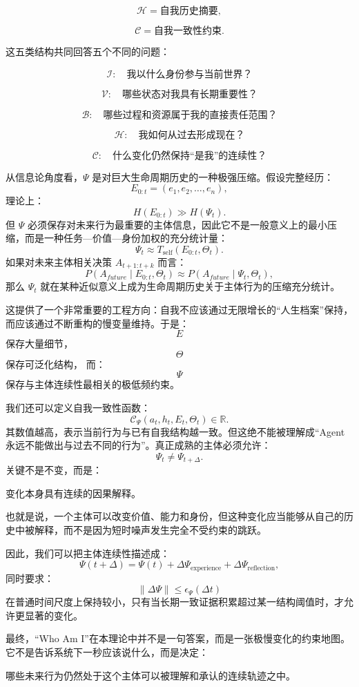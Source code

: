 \[
\mathcal H
=
\text{自我历史摘要},
\]

\[
\mathcal C
=
\text{自我一致性约束}.
\]

这五类结构共同回答五个不同的问题：

\[
\mathcal I:
\quad
\text{我以什么身份参与当前世界？}
\]

\[
\mathcal V:
\quad
\text{哪些状态对我具有长期重要性？}
\]

\[
\mathcal B:
\quad
\text{哪些过程和资源属于我的直接责任范围？}
\]

\[
\mathcal H:
\quad
\text{我如何从过去形成现在？}
\]

\[
\mathcal C:
\quad
\text{什么变化仍然保持“是我”的连续性？}
\]

从信息论角度看，$\Psi$ 是对巨大生命周期历史的一种极强压缩。假设完整经历：
\[
E_{0:t}
=
(e_1,e_2,\ldots,e_n),
\]
理论上：
\[
H(E_{0:t})
\gg
H(\Psi_t).
\]
但 $\Psi$ 必须保存对未来行为最重要的主体信息，因此它不是一般意义上的最小压缩，而是一种任务—价值—身份加权的充分统计量：
\[
\boxed{
\Psi_t
\approx
T_{\mathrm{self}}(E_{0:t},\Theta_t).
}
\]
如果对未来主体相关决策 $A_{t+1:t+k}$ 而言：
\[
P(A_{future}\mid E_{0:t},\Theta_t)
\approx
P(A_{future}\mid \Psi_t,\Theta_t),
\]
那么 $\Psi_t$ 就在某种近似意义上成为生命周期历史关于主体行为的压缩充分统计。

这提供了一个非常重要的工程方向：自我不应该通过无限增长的“人生档案”保持，而应该通过不断重构的慢变量维持。于是：
\[
E
\]
保存大量细节，
\[
\Theta
\]
保存可泛化结构，
而：
\[
\Psi
\]
保存与主体连续性最相关的极低频约束。

我们还可以定义自我一致性函数：
\[
\mathcal C_\Psi
\left(
a_t,
h_t,
E_t,
\Theta_t
\right)
\in
\mathbb R.
\]
其数值越高，表示当前行为与已有自我结构越一致。但这绝不能被理解成“Agent 永远不能做出与过去不同的行为”。真正成熟的主体必须允许：
\[
\Psi_t
\neq
\Psi_{t+\Delta}.
\]
关键不是不变，而是：
\begin{statementbox}
变化本身具有连续的因果解释。
\end{statementbox}
也就是说，一个主体可以改变价值、能力和身份，但这种变化应当能够从自己的历史中被解释，而不是因为短时噪声发生完全不受约束的跳跃。

因此，我们可以把主体连续性描述成：
\[
\Psi(t+\Delta)
=
\Psi(t)
+
\Delta\Psi_{\mathrm{experience}}
+
\Delta\Psi_{\mathrm{reflection}},
\]
同时要求：
\[
\|\Delta\Psi\|
\leq
\epsilon_\Psi(\Delta t)
\]
在普通时间尺度上保持较小，只有当长期一致证据积累超过某一结构阈值时，才允许更显著的变化。

最终，“Who Am I”在本理论中并不是一句答案，而是一张极慢变化的约束地图。它不是告诉系统下一秒应该说什么，而是决定：
\begin{statementbox}
哪些未来行为仍然处于这个主体可以被理解和承认的连续轨迹之中。
\end{statementbox}


